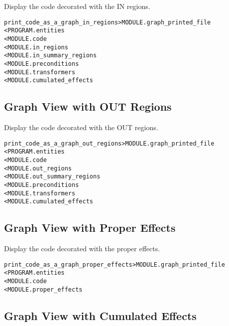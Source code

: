 \documentclass[a4paper]{report}
\newenvironment{PipsMake}{\begin{alltt}}{\end{alltt}}
\newenvironment{PipsPass}[1]{\label{pass:#1}}{}
\begin{document}
\begin{PipsPass}{print_code_as_a_graph_in_regions}
Display the code decorated with the IN regions.
\end{PipsPass}

\begin{PipsMake}
print_code_as_a_graph_in_regions              > MODULE.graph_printed_file
        < PROGRAM.entities
        < MODULE.code
        < MODULE.in_regions
        < MODULE.in_summary_regions
        < MODULE.preconditions
        < MODULE.transformers
        < MODULE.cumulated_effects
\end{PipsMake}

\subsection{Graph View with OUT Regions}

\begin{PipsPass}{print_code_as_a_graph_out_regions}
Display the code decorated with the OUT regions.
\end{PipsPass}

\begin{PipsMake}
print_code_as_a_graph_out_regions              > MODULE.graph_printed_file
        < PROGRAM.entities
        < MODULE.code
        < MODULE.out_regions
        < MODULE.out_summary_regions
        < MODULE.preconditions
        < MODULE.transformers
        < MODULE.cumulated_effects
\end{PipsMake}

\subsection{Graph View with Proper Effects}

\begin{PipsPass}{print_code_as_a_graph_proper_effects}
Display the code decorated with the proper effects.
\end{PipsPass}

\begin{PipsMake}
print_code_as_a_graph_proper_effects       > MODULE.graph_printed_file
        < PROGRAM.entities
        < MODULE.code
        < MODULE.proper_effects
\end{PipsMake}

\subsection{Graph View with Cumulated Effects}
\end{document}
